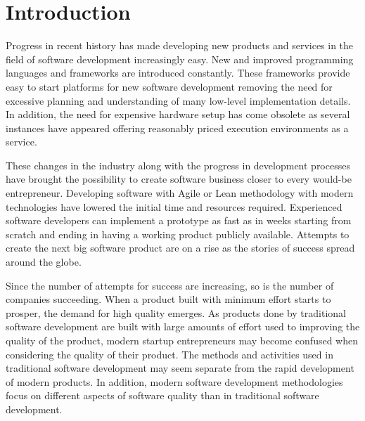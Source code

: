 
\chapter{Introduction}

% 

Progress in recent history has made developing new products and services in the field of software development increasingly easy. New and improved programming languages and frameworks are introduced constantly. These frameworks provide easy to start platforms for new software development removing the need for excessive planning and understanding of many low-level implementation details. In addition, the need for expensive hardware setup has come obsolete as several instances have appeared offering reasonably priced execution environments as a service. 

These changes in the industry along with the progress in development processes have brought the possibility to create software business closer to every would-be entrepreneur. Developing software with Agile or Lean methodology with modern technologies have lowered the initial time and resources required. Experienced software developers can implement a prototype as fast as in weeks starting from scratch and ending in having a working product publicly available. Attempts to create the next big software product are on a rise as the stories of success spread around the globe.


% 

Since the number of attempts for success are increasing, so is the number of companies succeeding. When a product built with minimum effort starts to prosper, the demand for high quality emerges. As products done by traditional software development are built with large amounts of effort used to improving the quality of the product, modern startup entrepreneurs may become confused when considering the quality of their product. The methods and activities used in traditional software development may seem separate from the rapid development of modern products. In addition, modern software development methodologies focus on different aspects of software quality than in traditional software development.

